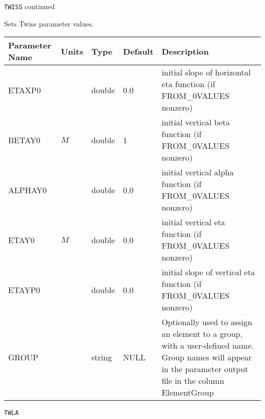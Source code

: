 \newpage
\begin{center}{\Large\verb|TWISS| continued}\end{center}
Sets Twiss parameter values.
\\
\begin{tabular}{|l|l|l|l|p{\descwidth}|} \hline
Parameter Name & Units & Type & Default & Description \\ \hline 
ETAXP0 &  & double &  0.0 & initial slope of horizontal eta function (if FROM\_0VALUES nonzero)  \\ \hline 
BETAY0 & $M$ & double &   1 & initial vertical beta function (if FROM\_0VALUES nonzero)  \\ \hline 
ALPHAY0 &  & double &  0.0 & initial vertical alpha function (if FROM\_0VALUES nonzero)  \\ \hline 
ETAY0 & $M$ & double &  0.0 & initial vertical eta function (if FROM\_0VALUES nonzero)  \\ \hline 
ETAYP0 &  & double &  0.0 & initial slope of vertical eta function (if FROM\_0VALUES nonzero)  \\ \hline 
GROUP &  & string & NULL & Optionally used to assign an element to a group, with a user-defined name.  Group names will appear in the parameter output file in the column ElementGroup  \\ \hline 
\end{tabular}

\vspace*{0.5in}

\newpage
\begin{center}{\Large\verb|TWLA|}\end{center}
